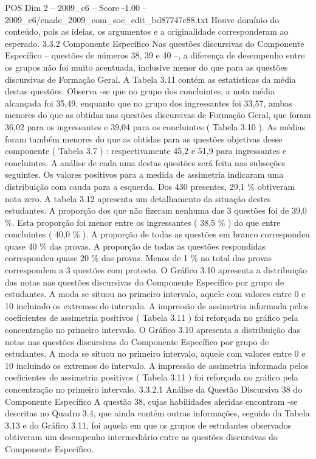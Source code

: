 \begin{textsample}{POS Dim 2 – 2009\_c6 – Score -1.00 – 2009\_c6/enade\_2009\_com\_soc\_edit\_bd87747c88.txt}
Houve domínio do conteúdo, pois as ideias, os argumentos e a originalidade corresponderam ao esperado. 3.3.2 Componente Específico Nas questões discursivas do Componente Específico – questões de números 38, 39 e 40 –, a diferença de desempenho entre os grupos não foi muito acentuada, inclusive menor do que para as questões discursivas de Formação Geral.
A Tabela 3.11 contém as estatísticas da média destas questões.
Observa -se que no grupo dos concluintes, a nota média alcançada foi 35,49, enquanto que no grupo dos ingressantes foi 33,57, ambas menores do que as obtidas nas questões discursivas de Formação Geral, que foram 36,02 para os ingressantes e 39,04 para os concluintes ( Tabela 3.10 ).
As médias foram também menores do que as obtidas para as questões objetivas desse componente ( Tabela 3.7 ) : respectivamente 45,2 e 51,9 para ingressantes e concluintes.
A análise de cada uma destas questões será feita nas subseções seguintes.
Os valores positivos para a medida de assimetria indicaram uma distribuição com cauda para a esquerda.
Dos 430 presentes, 29,1 \% obtiveram nota zero.
A tabela 3.12 apresenta um detalhamento da situação destes estudantes.
A proporção dos que não fizeram nenhuma das 3 questões foi de 39,0 \%.
Esta proporção foi menor entre os ingressantes ( 38,5 \% ) do que entre concluintes ( 40,0 \% ).
A proporção de todas as questões em branco correspondeu quase 40 \% das provas.
A proporção de todas as questões respondidas correspondeu quase 20 \% das provas.
Menos de 1 \% no total das provas correspondem a 3 questões com protesto.
O Gráfico 3.10 apresenta a distribuição das notas nas questões discursivas do Componente Específico por grupo de estudantes.
A moda se situou no primeiro intervalo, aquele com valores entre 0 e 10 incluindo os extremos do intervalo.
A impressão de assimetria informada pelos coeficientes de assimetria positivos ( Tabela 3.11 ) foi reforçada no gráfico pela concentração no primeiro intervalo.
O Gráfico 3.10 apresenta a distribuição das notas nas questões discursivas do Componente Específico por grupo de estudantes.
A moda se situou no primeiro intervalo, aquele com valores entre 0 e 10 incluindo os extremos do intervalo.
A impressão de assimetria informada pelos coeficientes de assimetria positivos ( Tabela 3.11 ) foi reforçada no gráfico pela concentração no primeiro intervalo. 3.3.2.1 Análise da Questão Discursiva 38 do Componente Específico A questão 38, cujas habilidades aferidas encontram -se descritas no Quadro 3.4, que ainda contém outras informações, seguido da Tabela 3.13 e do Gráfico 3.11, foi aquela em que os grupos de estudantes observados obtiveram um desempenho intermediário entre as questões discursivas do Componente Específico.

\end{textsample}
